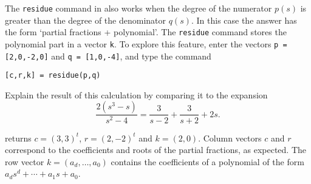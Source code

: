 \documentclass{ximera}
\begin{document}
\begin{exercise} \label{c13.3.4}
The {\tt residue} command in \Matlab also works when the degree of the
numerator $p(s)$ is greater than the degree of the denominator $q(s)$.
In this case the answer has the form `partial fractions + polynomial'.
The {\tt residue} command stores the polynomial part in a vector {\tt k}.
To explore this feature, enter the vectors {\tt p = [2,0,-2,0]} and
{\tt q = [1,0,-4]}, and type the command
\begin{verbatim}
[c,r,k] = residue(p,q)
\end{verbatim}
Explain the result of this calculation by comparing it to the expansion
\[
\frac{2(s^3-s)}{s^2-4} = \frac{3}{s-2} + \frac{3}{s+2} +2s.
\]

\begin{solution}

\Matlab returns $c = (3,3)^t$, $r = (2,-2)^t$ and $k = (2,0)$.
Column vectors $c$ and $r$ correspond to the coefficients and roots of
the partial fractions, as expected.  The row vector $k =
(a_d,\dots,a_0)$ contains the coefficients of a polynomial of the form
$a_ds^d + \cdots + a_1s + a_0$.

\end{solution}
\end{exercise}
\end{document}
